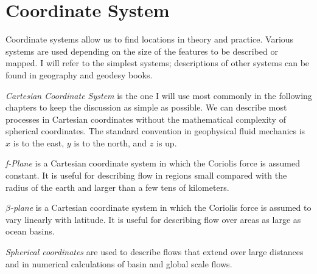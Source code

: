 \section{Coordinate System}
Coordinate systems allow us to find
locations in theory and practice. Various systems are used
depending on the size of the features to be described or mapped. I
will refer to the simplest systems; descriptions of other systems
can be found in geography and geodesy books.
\begin{enumerate}

\vitem\textit{Cartesian Coordinate System} is the one I will use most commonly in the following
chapters to keep the discussion as simple as possible. We can describe most
processes in Cartesian coordinates without the mathematical complexity of spherical
coordinates. The standard convention in geophysical fluid mechanics is $x$ is to the
east, $y$ is to the north, and $z$ is up. 

\textit{f-Plane}
is a Cartesian
coordinate system in which the Coriolis force is assumed constant. It is useful for describing
flow in regions small compared with the radius of the earth and larger than a few tens of
kilometers. 

\textit{$\beta$-plane}
is a
Cartesian coordinate system in which the Coriolis force is assumed to vary linearly
with latitude. It is useful for describing flow over areas as large as ocean basins.

\vitem\textit{Spherical coordinates} are used to describe
flows that extend over large distances and in numerical calculations of basin and global scale flows.
\end{enumerate}

